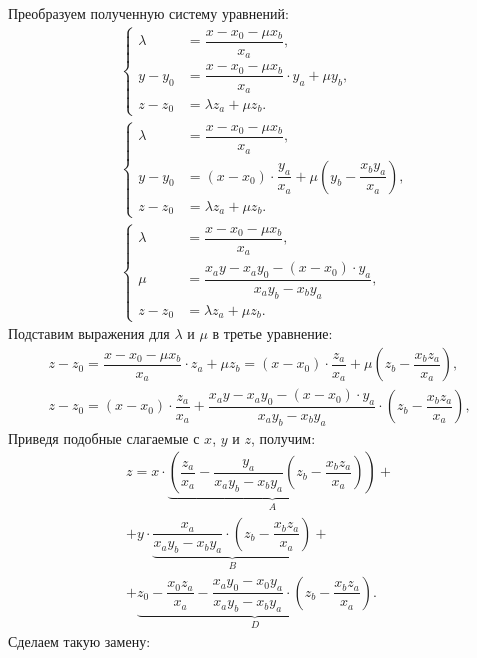 Преобразуем полученную систему уравнений:
\begin{align*}
& \left\{
\begin{aligned}
	\lambda &= \dfrac{x - x_0 - \mu x_b}{x_a},\\
	y - y_0 &= \dfrac{x - x_0 - \mu x_b}{x_a} \cdot y_a + \mu y_b,\\
	z - z_0 &= \lambda z_a + \mu z_b.
\end{aligned}\right.\\
& \left\{
\begin{aligned}
	\lambda &= \dfrac{x - x_0 - \mu x_b}{x_a},\\
	y - y_0 &= (x - x_0) \cdot \dfrac{y_a}{x_a} + \mu \left(y_b - \dfrac{x_b y_a}{x_a} \right),\\
	z - z_0 &= \lambda z_a + \mu z_b.
\end{aligned}\right.\\
&\left\{
\begin{aligned}
	\lambda &= \dfrac{x - x_0 - \mu x_b}{x_a},\\
	\mu &= \dfrac{x_a y - x_a y_0 - (x - x_0) \cdot y_a}{x_a y_b - x_b y_a},\\
	z - z_0 &= \lambda z_a + \mu z_b.
\end{aligned}\right.
\end{align*}
Подставим выражения для $\lambda$ и $\mu$ в третье уравнение:
\begin{gather*}
z - z_0 = \dfrac{x - x_0 - \mu x_b}{x_a} \cdot z_a + \mu z_b = (x - x_0) \cdot \dfrac{z_a}{x_a} + \mu \left( z_b - \dfrac{x_b z_a}{x_a} \right),\\
z - z_0 = (x - x_0) \cdot \dfrac{z_a}{x_a} + \dfrac{x_a y - x_a y_0 - (x - x_0) \cdot y_a}{x_a y_b - x_b y_a} \cdot \left( z_b - \dfrac{x_b z_a}{x_a} \right),
\end{gather*}
Приведя подобные слагаемые с $x$, $y$ и $z$, получим:
\begin{multline*}
z = x \cdot \underbrace{\left( \dfrac{z_a}{x_a} - \dfrac{y_a}{x_a y_b - x_b y_a} \left( z_b - \dfrac{x_b z_a}{x_a} \right) \right)}_A +\\
+ y \cdot \underbrace{\dfrac{x_a}{x_a y_b - x_b y_a} \cdot \left( z_b - \dfrac{x_b z_a}{x_a} \right)}_B +\\
+ \underbrace{z_0 - \dfrac{x_0 z_a}{x_a} - \dfrac{x_a y_0 - x_0 y_a}{x_a y_b - x_b y_a} \cdot \left( z_b - \dfrac{x_b z_a}{x_a} \right)}_D.
\end{multline*}
Сделаем такую замену:
